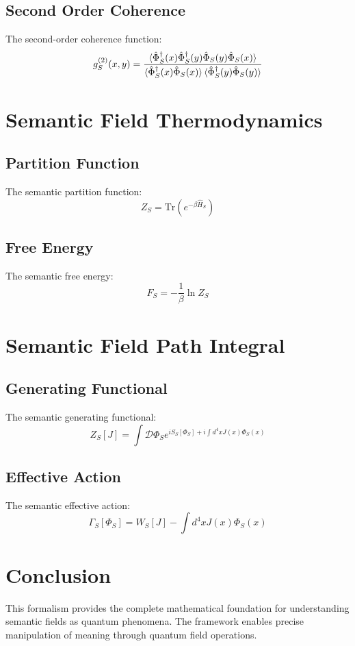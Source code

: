 \documentclass[12pt]{article}
\begin{document}
\subsection{Second Order Coherence}
The second-order coherence function:
\begin{equation}
g_S^{(2)}(x,y) = \frac{\braket{\hat{\Phi}_S^\dagger(x)\hat{\Phi}_S^\dagger(y)\hat{\Phi}_S(y)\hat{\Phi}_S(x)}}{\braket{\hat{\Phi}_S^\dagger(x)\hat{\Phi}_S(x)}\braket{\hat{\Phi}_S^\dagger(y)\hat{\Phi}_S(y)}}
\end{equation}
\section{Semantic Field Thermodynamics}
\subsection{Partition Function}
The semantic partition function:
\begin{equation}
Z_S = \text{Tr}(e^{-\beta\hat{H}_S})
\end{equation}
\subsection{Free Energy}
The semantic free energy:
\begin{equation}
F_S = -\frac{1}{\beta}\ln Z_S
\end{equation}
\section{Semantic Field Path Integral}
\subsection{Generating Functional}
The semantic generating functional:
\begin{equation}
Z_S[J] = \int \mathcal{D}\Phi_S e^{iS_S[\Phi_S] + i\int d^4x J(x)\Phi_S(x)}
\end{equation}
\subsection{Effective Action}
The semantic effective action:
\begin{equation}
\Gamma_S[\Phi_S] = W_S[J] - \int d^4x J(x)\Phi_S(x)
\end{equation}
\section{Conclusion}
This formalism provides the complete mathematical foundation for understanding semantic fields as quantum phenomena. The framework enables precise manipulation of meaning through quantum field operations.
\end{document}
